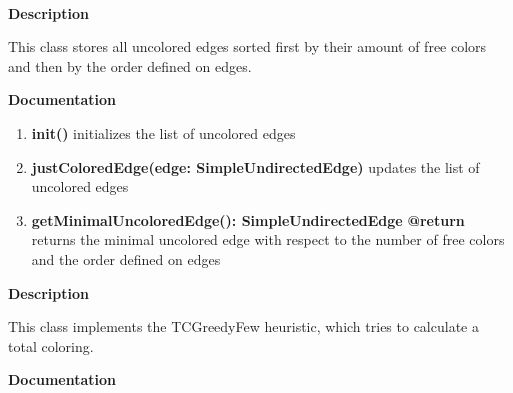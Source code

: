 	~\newpage
	
	
	\textbf{Description}
	
	This class stores all uncolored edges sorted first by their amount of free colors and then by the order defined on edges.
	
	\textbf{Documentation}
	
	\begin{enumerate}[\#]
		\item{
			\textbf{init()} \newline
			initializes the list of uncolored edges
		}
		\item{
			\textbf{justColoredEdge(edge: SimpleUndirectedEdge)} \newline
			updates the list of uncolored edges
		}
		\item{
			\textbf{getMinimalUncoloredEdge(): SimpleUndirectedEdge} \newline
			\textbf{@return} returns the minimal uncolored edge with respect to the number of free colors and the order defined on edges
		}
	\end{enumerate}
	
	
	\textbf{Description}
	
	This class implements the TCGreedyFew heuristic, which tries to calculate a total coloring.
	
	\textbf{Documentation}
	
